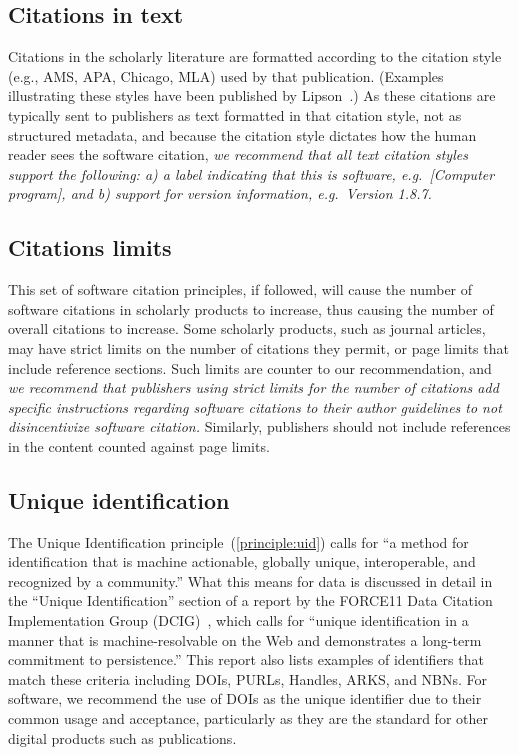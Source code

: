 \documentclass[11pt, oneside]{amsart}
\begin{document}
\subsection{Citations in text}

Citations in the scholarly literature are formatted according to the citation style (e.g., AMS, APA, Chicago, MLA) used by that publication. (Examples illustrating these styles have been published by Lipson~\cite{lipson2011cite}.)  As these citations are typically sent to publishers as text formatted in that citation style, not as structured metadata, and because the citation style dictates how the human reader sees the software citation, \textit{we recommend that all text citation styles support the following:
a) a label indicating that this is software, e.g.\ [Computer program], and b) support for version information, e.g.\ Version 1.8.7.}

\subsection{Citations limits}

This set of software citation principles, if followed, will cause the number of software citations in scholarly products to increase, thus causing the number of overall citations to increase. Some scholarly products, such as journal articles, may have strict limits on the number of citations they permit, or page limits that include reference sections. Such limits are counter to our recommendation, and \textit{we recommend that publishers using strict limits for the number of citations add specific instructions regarding software citations to their author guidelines to not disincentivize software citation.} Similarly, publishers should not include references in the content counted against page
limits.

\subsection{Unique identification}
\label{sec:identification}

The Unique Identification principle~(\ref{principle:uid}) calls for ``a method for identification that is machine actionable, globally unique, interoperable, and recognized by a community.''
What this means for data is discussed in detail in the ``Unique Identification'' section of a report by the FORCE11 Data Citation Implementation Group (DCIG)~\cite{10.7717/peerj-cs.1}, which calls for ``unique identification in a manner that is machine-resolvable on the Web and demonstrates a long-term commitment to persistence.''
This report also lists examples of identifiers that match these criteria including DOIs, PURLs, Handles, ARKS, and NBNs.
For software, we recommend the use of DOIs as the unique identifier due to their common usage and acceptance, particularly as they are the standard for other digital products such as publications.
\end{document}
